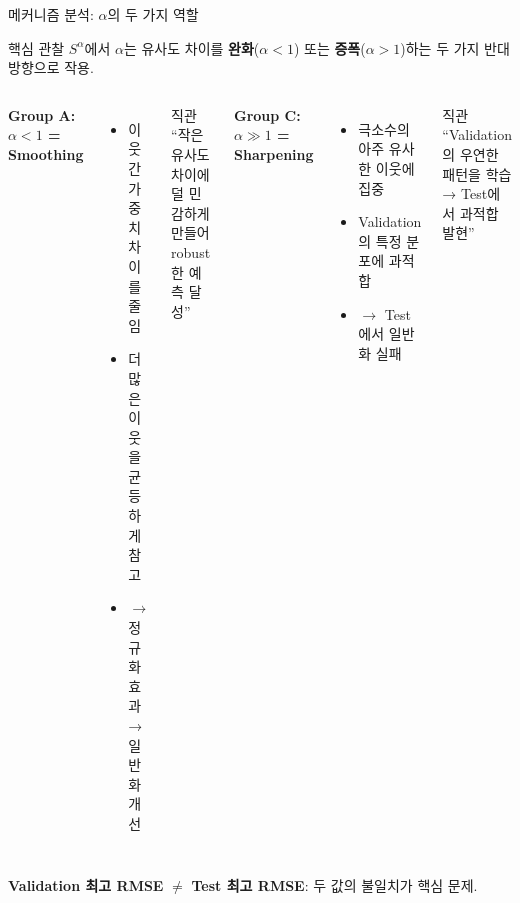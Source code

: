 \documentclass[aspectratio=169,10pt]{beamer}
\begin{document}
\begin{frame}{메커니즘 분석: \(\alpha\)의 두 가지 역할}
	\begin{block}{핵심 관찰}
		$S^{\alpha}$에서 \(\alpha\)는 유사도 차이를 \textbf{완화}(\(\alpha<1\)) 또는
		\textbf{증폭}(\(\alpha>1\))하는 두 가지 반대 방향으로 작용.
	\end{block}

	\vspace{0.3em}
	\begin{columns}[T]
			\textbf{Group A: \(\alpha<1\) = Smoothing}
			\begin{itemize}
				\item 이웃 간 가중치 차이를 줄임
				\item 더 많은 이웃을 균등하게 참고
				\item \(\to\) 정규화 효과 → 일반화 개선
			\end{itemize}
			\vspace{0.3em}
			\begin{exampleblock}{직관}
				``작은 유사도 차이에 덜 민감하게
				만들어 robust한 예측 달성''
			\end{exampleblock}

			\textbf{Group C: \(\alpha\gg1\) = Sharpening}
			\begin{itemize}
				\item 극소수의 아주 유사한 이웃에 집중
				\item Validation의 특정 분포에 과적합
				\item \(\to\) Test에서 일반화 실패
			\end{itemize}
			\vspace{0.3em}
			\begin{alertblock}{직관}
				``Validation의 우연한 패턴을
				학습 → Test에서 과적합 발현''
			\end{alertblock}
	\end{columns}

	\vspace{0.3em}
	\begin{center}
		\textbf{Validation 최고 RMSE} \(\neq\) \textbf{Test 최고 RMSE}: 두 값의 불일치가 핵심 문제.
	\end{center}
\end{frame}
\end{document}
